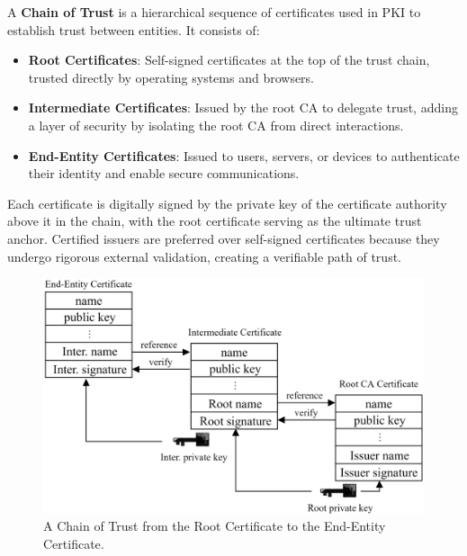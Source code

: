 \begin{Def}

    A \textbf{Chain of Trust} is a hierarchical sequence of certificates used in PKI to establish trust between entities. It consists of:
    \begin{itemize}
        \item \textbf{Root Certificates}: Self-signed certificates at the top of the trust chain, trusted directly by operating systems and browsers.
        \item \textbf{Intermediate Certificates}: Issued by the root CA to delegate trust, adding a layer of security by isolating the root CA from direct interactions.
        \item \textbf{End-Entity Certificates}: Issued to users, servers, or devices to authenticate their identity and enable secure communications.
    \end{itemize}
    Each certificate is digitally signed by the private key of the certificate authority above it in the chain, with the root certificate serving as the ultimate trust anchor.
    Certified issuers are preferred over self-signed certificates because they undergo rigorous external validation, creating a verifiable path of trust. \hfill \cite{rfc5280}
\end{Def}

\newpage 

\begin{figure}[h!]
    \centering
    \includegraphics[width=1\textwidth]{Sections/sec/chain.png}
    \caption{A Chain of Trust from the Root Certificate to the End-Entity Certificate.}
    \label{fig:chain}
\end{figure}


